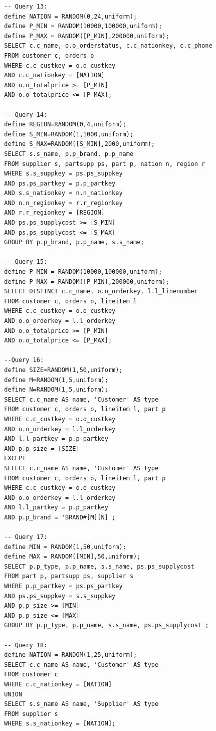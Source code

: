 \begin{toappendix}
\begin{verbatim}
  -- Query 13:
  define NATION = RANDOM(0,24,uniform);
  define P_MIN = RANDOM(10000,100000,uniform);
  define P_MAX = RANDOM([P_MIN],200000,uniform);
  SELECT c.c_name, o.o_orderstatus, c.c_nationkey, c.c_phone
  FROM customer c, orders o
  WHERE c.c_custkey = o.o_custkey
  AND c.c_nationkey = [NATION]
  AND o.o_totalprice >= [P_MIN]
  AND o.o_totalprice <= [P_MAX];

  -- Query 14:
  define REGION=RANDOM(0,4,uniform);
  define S_MIN=RANDOM(1,1000,uniform);
  define S_MAX=RANDOM([S_MIN],2000,uniform);
  SELECT s.s_name, p.p_brand, p.p_name
  FROM supplier s, partsupp ps, part p, nation n, region r
  WHERE s.s_suppkey = ps.ps_suppkey
  AND ps.ps_partkey = p.p_partkey
  AND s.s_nationkey = n.n_nationkey
  AND n.n_regionkey = r.r_regionkey
  AND r.r_regionkey = [REGION]
  AND ps.ps_supplycost >= [S_MIN]
  AND ps.ps_supplycost <= [S_MAX]
  GROUP BY p.p_brand, p.p_name, s.s_name;

  -- Query 15:
  define P_MIN = RANDOM(10000,100000,uniform);
  define P_MAX = RANDOM([P_MIN],200000,uniform);
  SELECT DISTINCT c.c_name, o.o_orderkey, l.l_linenumber
  FROM customer c, orders o, lineitem l
  WHERE c.c_custkey = o.o_custkey
  AND o.o_orderkey = l.l_orderkey
  AND o.o_totalprice >= [P_MIN]
  AND o.o_totalprice <= [P_MAX];

  --Query 16:
  define SIZE=RANDOM(1,50,uniform);
  define M=RANDOM(1,5,uniform);
  define N=RANDOM(1,5,uniform);
  SELECT c.c_name AS name, 'Customer' AS type
  FROM customer c, orders o, lineitem l, part p
  WHERE c.c_custkey = o.o_custkey
  AND o.o_orderkey = l.l_orderkey
  AND l.l_partkey = p.p_partkey
  AND p.p_size = [SIZE]
  EXCEPT
  SELECT c.c_name AS name, 'Customer' AS type
  FROM customer c, orders o, lineitem l, part p
  WHERE c.c_custkey = o.o_custkey
  AND o.o_orderkey = l.l_orderkey
  AND l.l_partkey = p.p_partkey
  AND p.p_brand = 'BRAND#[M][N]';

  -- Query 17:
  define MIN = RANDOM(1,50,uniform);
  define MAX = RANDOM([MIN],50,uniform);
  SELECT p.p_type, p.p_name, s.s_name, ps.ps_supplycost
  FROM part p, partsupp ps, supplier s
  WHERE p.p_partkey = ps.ps_partkey
  AND ps.ps_suppkey = s.s_suppkey
  AND p.p_size >= [MIN]
  AND p.p_size <= [MAX]
  GROUP BY p.p_type, p.p_name, s.s_name, ps.ps_supplycost ;

  -- Query 18:
  define NATION = RANDOM(1,25,uniform);
  SELECT c.c_name AS name, 'Customer' AS type
  FROM customer c
  WHERE c.c_nationkey = [NATION]
  UNION
  SELECT s.s_name AS name, 'Supplier' AS type
  FROM supplier s
  WHERE s.s_nationkey = [NATION];
  \end{verbatim}


\end{toappendix}
